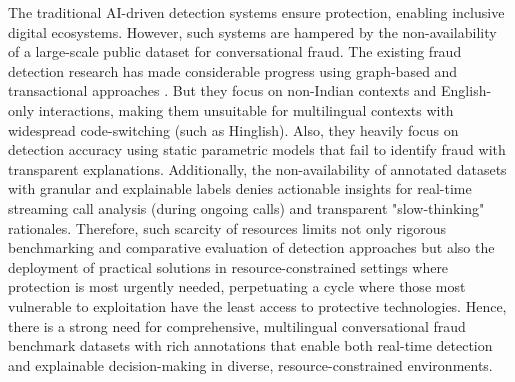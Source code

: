 \documentclass{article}
\begin{document}
The traditional AI-driven detection systems ensure protection, enabling inclusive digital ecosystems. However, such systems are hampered by the non-availability of a large-scale public dataset for conversational fraud. The existing fraud detection research has made considerable progress using graph-based and transactional approaches \cite{li2025mutationguard,wu2024safeguarding,zou2024effective}. But they focus on non-Indian contexts and English-only interactions, making them unsuitable for multilingual contexts with widespread code-switching (such as Hinglish). Also, they heavily focus on detection accuracy using static parametric models that fail to identify fraud with transparent explanations. Additionally, the non-availability of annotated datasets with granular and explainable labels denies actionable insights for real-time streaming call analysis (during ongoing calls) and transparent "slow-thinking" rationales. Therefore, such scarcity of resources limits not only rigorous benchmarking and comparative evaluation of detection approaches but also the deployment of practical solutions in resource-constrained settings where protection is most urgently needed, perpetuating a cycle where those most vulnerable to exploitation have the least access to protective technologies. Hence, there is a strong need for comprehensive, multilingual conversational fraud benchmark datasets with rich annotations that enable both real-time detection and explainable decision-making in diverse, resource-constrained environments.
\end{document}
